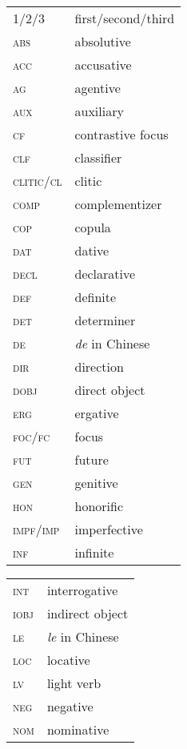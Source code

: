 
\begin{multicols}{2} 


\begin{tabular}{lp{4.5cm}} 
\textsc{1}/\textsc{2}/\textsc{3} & first/second/third \\ 
\textsc{abs} & absolutive \\ 
\textsc{acc} & accusative \\ 
\textsc{ag} & agentive \\ 
\textsc{aux} & auxiliary \\ 
\textsc{cf} & contrastive focus \\ 
\textsc{clf} & classifier \\ 
\textsc{clitic}/\textsc{cl} & clitic \\ 
\textsc{comp} & complementizer \\ 
\textsc{cop} & copula \\ 
\textsc{dat} & dative \\ 
\textsc{decl} & declarative \\ 
\textsc{def} & definite \\ 
\textsc{det} & determiner \\ 
\textsc{de} & \textit{de} in Chinese \\ 
\textsc{dir} & direction \\ 
\textsc{dobj} & direct object \\ 
\textsc{erg} & ergative \\ 
\textsc{foc}/\textsc{fc} & focus \\ 
\textsc{fut} & future \\ 
\textsc{gen} & genitive \\ 
\textsc{hon} & honorific \\ 
\textsc{impf}/\textsc{imp} & imperfective \\ 
\textsc{inf} & infinite \\ 
\end{tabular}
%
\begin{tabular}{lp{4.5cm}} 
\textsc{int} & interrogative \\ 
\textsc{iobj} & indirect object \\ 
\textsc{le} & \textit{le} in Chinese \\ 
\textsc{loc} & locative \\ 
\textsc{lv} & light verb \\ 
\textsc{neg} & negative \\ 
\textsc{nom} & nominative \\ 

\end{tabular}
\end{multicols}
